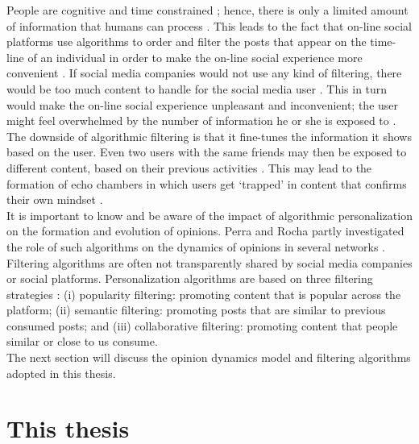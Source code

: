 \documentclass[11 pt , letterpaper , twoside , openright]{book}
\begin{document}
People are cognitive and time constrained \cite{Perra2019}; hence, there is only a limited amount of information that humans can process \cite{Bozdag2013}. This leads to the fact that on-line social platforms use algorithms to order and filter the posts that appear on the time-line of an individual in order to make the on-line social experience more convenient \cite{Perra2019}. If social media companies would not use any kind of filtering, there would be too much content to handle for the social media user \cite{Bozdag2013}. This in turn would make the on-line social experience unpleasant and inconvenient; the user might feel overwhelmed by the number of information he or she is exposed to \cite{Bozdag2013}. \\
\newline
The downside of algorithmic filtering is that it fine-tunes the information it shows based on the user. Even two users with the same friends may then be exposed to different content, based on their previous activities \cite{Bozdag2013}. This may lead to the formation of echo chambers in which users get `trapped' in content that confirms their own mindset \cite{Bozdag2013}. \\
\newline
It is important to know and be aware of the impact of algorithmic personalization on the formation and evolution of opinions. Perra and Rocha partly investigated the role of such algorithms on the dynamics of opinions in several networks \cite{Perra2019}. Filtering algorithms are often not transparently shared by social media companies or social platforms. Personalization algorithms are based on three filtering strategies \cite{Perra2019}: (i) popularity filtering: promoting content that is popular across the platform; (ii) semantic filtering: promoting posts that are similar to previous consumed posts; and (iii) collaborative filtering: promoting content that people similar or close to us consume.\\ 
\newline
The next section will discuss the opinion dynamics model and filtering algorithms adopted in this thesis.

\section{This thesis}\label{modelThesis}
\end{document}
